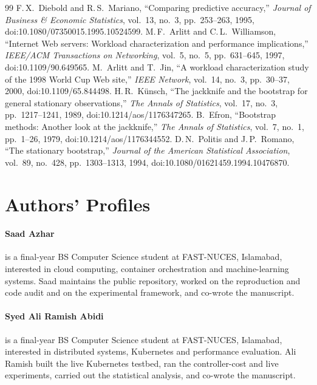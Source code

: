\documentclass[conference,a4paper]{IEEEtran}
\begin{document}
\begin{thebibliography}{99}
 F.\,X.\ Diebold and R.\,S.\ Mariano, ``Comparing predictive accuracy,'' \textit{Journal of Business \& Economic Statistics}, vol.~13, no.~3, pp.~253--263, 1995, doi:10.1080/07350015.1995.10524599.
 M.\,F.\ Arlitt and C.\,L.\ Williamson, ``Internet Web servers: Workload characterization and performance implications,'' \textit{IEEE/ACM Transactions on Networking}, vol.~5, no.~5, pp.~631--645, 1997, doi:10.1109/90.649565.
 M.\ Arlitt and T.\ Jin, ``A workload characterization study of the 1998 World Cup Web site,'' \textit{IEEE Network}, vol.~14, no.~3, pp.~30--37, 2000, doi:10.1109/65.844498.
 H.\,R.\ K\"unsch, ``The jackknife and the bootstrap for general stationary observations,'' \textit{The Annals of Statistics}, vol.~17, no.~3, pp.~1217--1241, 1989, doi:10.1214/aos/1176347265.
 B.\ Efron, ``Bootstrap methods: Another look at the jackknife,'' \textit{The Annals of Statistics}, vol.~7, no.~1, pp.~1--26, 1979, doi:10.1214/aos/1176344552.
 D.\,N.\ Politis and J.\,P.\ Romano, ``The stationary bootstrap,'' \textit{Journal of the American Statistical Association}, vol.~89, no.~428, pp.~1303--1313, 1994, doi:10.1080/01621459.1994.10476870.
\end{thebibliography}

\section*{Authors' Profiles}
\paragraph{Saad Azhar} is a final-year BS Computer Science student at FAST-NUCES,
Islamabad, interested in cloud computing, container orchestration and machine-learning systems. Saad maintains the
public repository, worked on the reproduction and code audit and on the experimental framework, and co-wrote the
manuscript.

\paragraph{Syed Ali Ramish Abidi} is a final-year BS Computer Science student at
FAST-NUCES, Islamabad, interested in distributed systems, Kubernetes and performance evaluation. Ali Ramish built the live
Kubernetes testbed, ran the controller-cost and live experiments, carried out the statistical analysis, and
co-wrote the manuscript.
\end{document}
